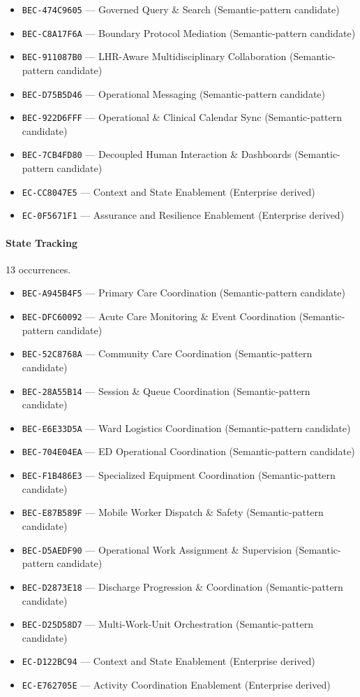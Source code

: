 \documentclass[11pt,a4paper,openany]{book}
\begin{document}
\begin{itemize}
\item \texttt{BEC-474C9605} --- Governed Query \& Search (Semantic-pattern candidate)
\item \texttt{BEC-C8A17F6A} --- Boundary Protocol Mediation (Semantic-pattern candidate)
\item \texttt{BEC-911087B0} --- LHR-Aware Multidisciplinary Collaboration (Semantic-pattern candidate)
\item \texttt{BEC-D75B5D46} --- Operational Messaging (Semantic-pattern candidate)
\item \texttt{BEC-922D6FFF} --- Operational \& Clinical Calendar Sync (Semantic-pattern candidate)
\item \texttt{BEC-7CB4FD80} --- Decoupled Human Interaction \& Dashboards (Semantic-pattern candidate)
\item \texttt{EC-CC8047E5} --- Context and State Enablement (Enterprise derived)
\item \texttt{EC-0F5671F1} --- Assurance and Resilience Enablement (Enterprise derived)
\end{itemize}
\paragraph{State Tracking} 13 occurrences.\par
\begin{itemize}
\item \texttt{BEC-A945B4F5} --- Primary Care Coordination (Semantic-pattern candidate)
\item \texttt{BEC-DFC60092} --- Acute Care Monitoring \& Event Coordination (Semantic-pattern candidate)
\item \texttt{BEC-52C8768A} --- Community Care Coordination (Semantic-pattern candidate)
\item \texttt{BEC-28A55B14} --- Session \& Queue Coordination (Semantic-pattern candidate)
\item \texttt{BEC-E6E33D5A} --- Ward Logistics Coordination (Semantic-pattern candidate)
\item \texttt{BEC-704E04EA} --- ED Operational Coordination (Semantic-pattern candidate)
\item \texttt{BEC-F1B486E3} --- Specialized Equipment Coordination (Semantic-pattern candidate)
\item \texttt{BEC-E87B589F} --- Mobile Worker Dispatch \& Safety (Semantic-pattern candidate)
\item \texttt{BEC-D5AEDF90} --- Operational Work Assignment \& Supervision (Semantic-pattern candidate)
\item \texttt{BEC-D2873E18} --- Discharge Progression \& Coordination (Semantic-pattern candidate)
\item \texttt{BEC-D25D58D7} --- Multi-Work-Unit Orchestration (Semantic-pattern candidate)
\item \texttt{EC-D122BC94} --- Context and State Enablement (Enterprise derived)
\item \texttt{EC-E762705E} --- Activity Coordination Enablement (Enterprise derived)
\end{itemize}
\end{document}

